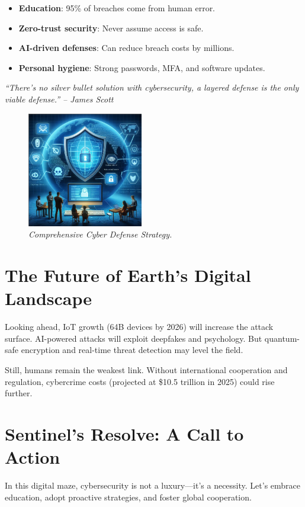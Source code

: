 \documentclass[a4paper,10pt,twocolumn]{memoir}
\newenvironment{magquote}
  {\begin{shaded*}\itshape\small}
  {\end{shaded*}}
\begin{document}
\begin{itemize}
  \item \textbf{Education}: 95\% of breaches come from human error.
  \item \textbf{Zero-trust security}: Never assume access is safe.
  \item \textbf{AI-driven defenses}: Can reduce breach costs by millions.
  \item \textbf{Personal hygiene}: Strong passwords, MFA, and software updates.
\end{itemize}

\begin{magquote}
``There's no silver bullet solution with cybersecurity, a layered defense is the only viable defense.'' -- James Scott
\end{magquote}

\begin{figure}[h]
  \centering
  \includegraphics[width=0.45\textwidth]{security.png}
  \caption*{\textit{Comprehensive Cyber Defense Strategy.}}
\end{figure}

\section*{The Future of Earth’s Digital Landscape}
Looking ahead, IoT growth (64B devices by 2026) will increase the attack surface. AI-powered attacks will exploit deepfakes and psychology. But quantum-safe encryption and real-time threat detection may level the field.

Still, humans remain the weakest link. Without international cooperation and regulation, cybercrime costs (projected at \$10.5 trillion in 2025) could rise further.

\section*{Sentinel’s Resolve: A Call to Action}
In this digital maze, cybersecurity is not a luxury—it’s a necessity. Let’s embrace education, adopt proactive strategies, and foster global cooperation.
\end{document}

